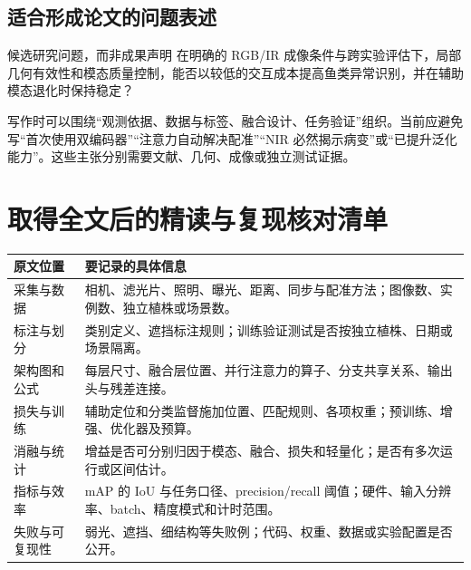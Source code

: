 \documentclass[UTF8,a4paper,11pt,fontset=windows]{ctexart}
\newcommand{\newpagepart}{\clearpage}
\begin{document}
\subsection{适合形成论文的问题表述}
\begin{note}{候选研究问题，而非成果声明}
在明确的 RGB/IR 成像条件与跨实验评估下，局部几何有效性和模态质量控制，能否以较低的交互成本提高鱼类异常识别，并在辅助模态退化时保持稳定？
\end{note}
写作时可以围绕“观测依据、数据与标签、融合设计、任务验证”组织。当前应避免写“首次使用双编码器”“注意力自动解决配准”“NIR 必然揭示病变”或“已提升泛化能力”。这些主张分别需要文献、几何、成像或独立测试证据。

\newpagepart
\section{取得全文后的精读与复现核对清单}
\noindent\begin{tabularx}{\linewidth}{@{}L{2.8cm}Y@{}}
\toprule
原文位置 & 要记录的具体信息\\
\midrule
采集与数据 & 相机、滤光片、照明、曝光、距离、同步与配准方法；图像数、实例数、独立植株或场景数。\\
标注与划分 & 类别定义、遮挡标注规则；训练验证测试是否按独立植株、日期或场景隔离。\\
架构图和公式 & 每层尺寸、融合层位置、并行注意力的算子、分支共享关系、输出头与残差连接。\\
损失与训练 & 辅助定位和分类监督施加位置、匹配规则、各项权重；预训练、增强、优化器及预算。\\
消融与统计 & 增益是否可分别归因于模态、融合、损失和轻量化；是否有多次运行或区间估计。\\
指标与效率 & mAP 的 IoU 与任务口径、precision/recall 阈值；硬件、输入分辨率、batch、精度模式和计时范围。\\
失败与可复现性 & 弱光、遮挡、细结构等失败例；代码、权重、数据或实验配置是否公开。\\
\bottomrule
\end{tabularx}
\end{document}
